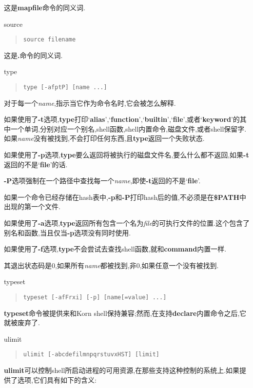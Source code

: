 \documentclass[draft,openany]{book}
\begin{document}
\begin{CJK}{UTF8}{gbsn}
\begin{basedescript}{\desclabelstyle{\nextlinelabel}\desclabelwidth{2.5em}}
        这是\textbf{mapfile}命令的同义词.
    \item[source]
        \begin{quote}
            \verb+source filename+
        \end{quote}
        这是\textbf{.}命令的同义词.
    \item[type]
        \begin{quote}
            \verb+type [-afptP] [name ...]+
        \end{quote}
        对于每一个\emph{name},指示当它作为命令名时,它会被怎么解释.\par
        如果使用了\textbf{-t}选项,\textbf{type}打印`\textbf{alias}',`\textbf{function}',`\textbf{builtin}',`\textbf{file}',或者`\textbf{keyword}'的其中一个单词,分别对应一个别名,shell函数,shell内置命令,磁盘文件,或者shell保留字.如果\emph{name}没有被找到,不会打印任何东西,且\textbf{type}返回一个失败状态.\par
        如果使用了\textbf{-p}选项,\textbf{type}要么返回将被执行的磁盘文件名,要么什么都不返回,如果\textbf{-t}返回的不是`\textbf{file}'的话.\par
        \textbf{-P}选项强制在一个路径中查找每一个\emph{name},即使\textbf{-t}返回的不是`\textbf{file}'.\par
        如果一个命令已经存储在hash表中,\textbf{-p}和\textbf{-P}打印hash后的值,不必须是在\textbf{\$PATH}中出现的第一个文件.\par
        如果使用了\textbf{-a}选项,\textbf{type}返回所有包含一个名为\emph{file}的可执行文件的位置.这个包含了别名和函数,当且仅当\textbf{-p}选项没有同时使用.\par
        如果使用了\textbf{-f}选项,\textbf{type}不会尝试去查找shell函数,就和\textbf{command}内置一样.\par
        其退出状态码是0,如果所有\emph{name}都被找到,非0,如果任意一个没有被找到.
    \item[typeset]
        \begin{quote}
            \verb+typeset [-afFrxi] [-p] [name[=value] ...]+
        \end{quote}
        \textbf{typeset}命令被提供来和Korn shell保持兼容;然而,在支持\textbf{declare}内置命令之后,它就被废弃了.
    \item[ulimit]
        \begin{quote}
            \verb+ulimit [-abcdefilmnpqrstuvxHST] [limit]+
        \end{quote}
        \textbf{ulimit}可以控制shell所启动进程的可用资源,在那些支持这种控制的系统上.如果提供了选项,它们具有如下的含义:

\end{basedescript}
\end{CJK}
\end{document}
